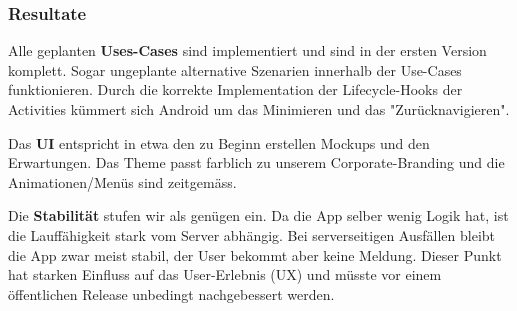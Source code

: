 \subsubsection{Resultate}\label{test_resulate}
Alle geplanten \textbf{Uses-Cases} sind implementiert und sind in der ersten Version komplett. Sogar
ungeplante alternative Szenarien innerhalb der Use-Cases funktionieren. Durch die korrekte Implementation
der Lifecycle-Hooks der Activities kümmert sich Android um das Minimieren und das "Zurücknavigieren".

Das \textbf{UI} entspricht in etwa den zu Beginn erstellen Mockups und den Erwartungen. Das Theme passt
farblich zu unserem Corporate-Branding und die Animationen/Menüs sind zeitgemäss.

Die \textbf{Stabilität} stufen wir als genügen ein. Da die App selber wenig Logik hat, ist die Lauffähigkeit
stark vom Server abhängig. Bei serverseitigen Ausfällen bleibt die App zwar meist stabil, der User
bekommt aber keine Meldung. Dieser Punkt hat starken Einfluss auf das User-Erlebnis (UX) und müsste
vor einem öffentlichen Release unbedingt nachgebessert werden.
